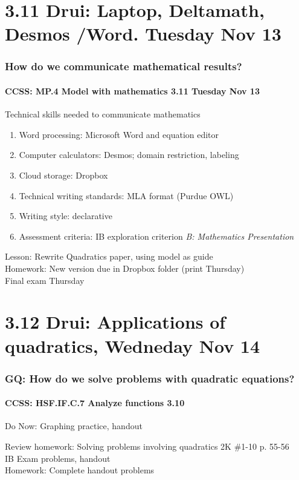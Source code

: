 \documentclass{beamer}
\begin{document}
  \section{3.11 Drui: Laptop, Deltamath, Desmos /Word. Tuesday Nov 13}
    \frame
    {
      \frametitle{How do we communicate mathematical results?}
      \framesubtitle{CCSS: MP.4 Model with mathematics  \alert{3.11 Tuesday Nov 13}}

      \begin{block}{Technical skills needed to communicate mathematics}
      \begin{enumerate}
          \item Word processing: Microsoft Word and equation editor
          \item Computer calculators: Desmos; domain restriction, labeling
          \item Cloud storage: Dropbox
          \item Technical writing standards: MLA format (Purdue OWL)
          \item Writing style: declarative
          \item Assessment criteria: IB exploration criterion \emph{B: Mathematics Presentation}
      \end{enumerate}
      \end{block}
      Lesson: Rewrite Quadratics paper, using model as guide\\ \bigskip
      Homework: New version due in Dropbox folder (print Thursday)\\
      \alert{Final exam Thursday}
    }


  \section{3.12 Drui: Applications of quadratics, Wedneday Nov 14}
    \frame
    {
      \frametitle{GQ: How do we solve problems with quadratic equations?}
      \framesubtitle{CCSS: HSF.IF.C.7 Analyze functions    \alert{3.10}}

      \begin{block}{Do Now: Graphing practice, handout}
      \end{block}
      Review homework: Solving problems involving quadratics 2K \#1-10 p. 55-56 \\
      IB Exam problems, handout\\ \bigskip
      Homework: Complete handout problems
    }
\end{document}
